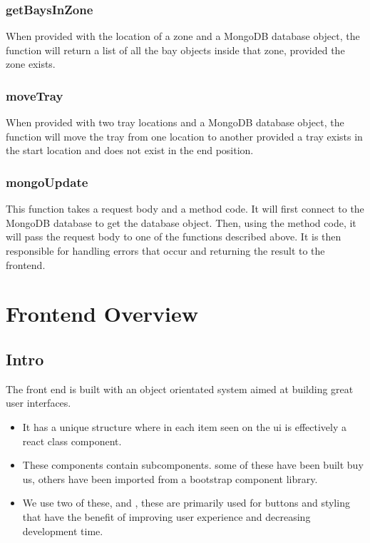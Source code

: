 \documentclass[letterpaper,10pt,english]{sphinxmanual}
\let\oldsubsection\subsection
\renewcommand{\subsection}{\needspace{6\baselineskip}\oldsubsection}
\begin{document}
\subsubsection{getBaysInZone}
\label{\detokenize{docs/System_Overview/Backend_overview:getbaysinzone}}
When provided with the location of a zone and a MongoDB database object,
the function will return a list of all the bay objects inside that zone,
provided the zone exists.


\subsubsection{moveTray}
\label{\detokenize{docs/System_Overview/Backend_overview:movetray}}
When provided with two tray locations and a MongoDB database object, the
function will move the tray from one location to another provided a tray
exists in the start location and does not exist in the end position.


\subsubsection{mongoUpdate}
\label{\detokenize{docs/System_Overview/Backend_overview:mongoupdate}}
This function takes a request body and a method code. It will first
connect to the MongoDB database to get the database object. Then, using
the method code, it will pass the request body to one of the functions
described above. It is then responsible for handling errors that occur
and returning the result to the front\sphinxhyphen{}end.


\section{Frontend Overview}
\label{\detokenize{docs/System_Overview/Frontend_overview:frontend-overview}}\label{\detokenize{docs/System_Overview/Frontend_overview::doc}}

\subsection{Intro}
\label{\detokenize{docs/System_Overview/Frontend_overview:intro}}
The front end is built with  an object
orientated system aimed at building great user interfaces.
\begin{itemize}
\item {} 
It has a unique structure where in each item seen on the ui is effectively a
react class component.

\item {} 
These components contain subcomponents. some of these have been built buy us, others have been imported from a boot\sphinxhyphen{}strap component library.

\item {} 
We use two of these,  and ,
these are primarily used for buttons and styling that have the benefit of improving user
experience and decreasing development time.

\end{itemize}
\end{document}
